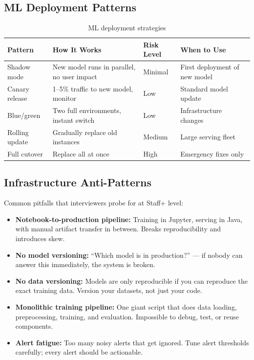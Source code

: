 \subsection{ML Deployment Patterns}

\begin{table}[H]
\centering
\caption{ML deployment strategies}
\begin{tabularx}{\textwidth}{lXXl}
\toprule
\textbf{Pattern} & \textbf{How It Works} & \textbf{Risk Level} & \textbf{When to Use} \\
\midrule
Shadow mode & New model runs in parallel, no user impact & Minimal & First deployment of new model \\
Canary release & 1--5\% traffic to new model, monitor & Low & Standard model update \\
Blue/green & Two full environments, instant switch & Low & Infrastructure changes \\
Rolling update & Gradually replace old instances & Medium & Large serving fleet \\
Full cutover & Replace all at once & High & Emergency fixes only \\
\bottomrule
\end{tabularx}
\end{table}

\subsection{Infrastructure Anti-Patterns}

Common pitfalls that interviewers probe for at Staff+ level:

\begin{itemize}
    \item \textbf{Notebook-to-production pipeline:} Training in Jupyter, serving in Java, with manual artifact transfer in between. Breaks reproducibility and introduces skew.
    \item \textbf{No model versioning:} ``Which model is in production?'' --- if nobody can answer this immediately, the system is broken.
    \item \textbf{No data versioning:} Models are only reproducible if you can reproduce the exact training data. Version your datasets, not just your code.
    \item \textbf{Monolithic training pipeline:} One giant script that does data loading, preprocessing, training, and evaluation. Impossible to debug, test, or reuse components.
    \item \textbf{Alert fatigue:} Too many noisy alerts that get ignored. Tune alert thresholds carefully; every alert should be actionable.
\end{itemize}

